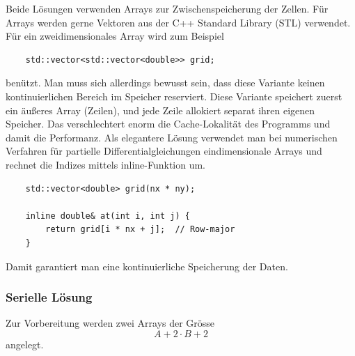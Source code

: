 Beide Lösungen verwenden Arrays zur Zwischenspeicherung der Zellen.
Für Arrays werden gerne Vektoren aus der C++ Standard Library (STL) verwendet.
Für ein zweidimensionales Array wird zum Beispiel
\begin{lstlisting}
	std::vector<std::vector<double>> grid;
\end{lstlisting}
benützt.
Man muss sich allerdings bewusst sein, dass diese Variante keinen kontinuierlichen Bereich im Speicher reserviert.
Diese Variante speichert zuerst ein äußeres Array (Zeilen), und jede Zeile allokiert separat ihren eigenen Speicher.
Das verschlechtert enorm die Cache-Lokalität des Programms und damit die Performanz.
Als elegantere Lösung verwendet man bei numerischen Verfahren für partielle Differentialgleichungen eindimensionale Arrays und rechnet die Indizes mittels inline-Funktion um.
\begin{lstlisting}
	std::vector<double> grid(nx * ny);
	
	inline double& at(int i, int j) {
		return grid[i * nx + j];  // Row-major
	}
\end{lstlisting}
Damit garantiert man eine kontinuierliche Speicherung der Daten.

\subsubsection{Serielle Lösung}
\label{parallelisierung:sub:serLoesung}
Zur Vorbereitung werden zwei Arrays der Grösse 
\begin{equation}
\label{parallelisierung:eq:Arrays}
A+2 \cdot B+2 
\end{equation}
angelegt. 

